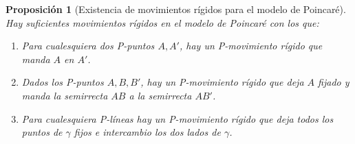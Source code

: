 \documentclass[a4paper]{amsart}
\theoremstyle{plain}
\newtheorem{proposition}{Proposición}
\begin{document}
\begin{proposition}[Existencia de movimientos rígidos para el modelo de Poincaré]
Hay suficientes movimientos rígidos en el modelo de Poincaré con los que:\\
\begin{enumerate}
\item [(1)] Para cualesquiera dos P-\textit{puntos} $A,A'$, hay un P-\textit{movimiento rígido} que manda $A$ en $A'$.
\item [(2)] Dados los P-\textit{puntos} $A,B,B'$, hay un P-\textit{movimiento rígido} que deja $A$ fijado y manda la semirrecta $AB$ a la semirrecta $AB'$.
\item [(3)] Para cualesquiera P-\textit{líneas} hay un P-\textit{movimiento rígido} que deja todos los puntos de $\gamma$ fijos e intercambio los dos lados de $\gamma$.
\end{enumerate}
\end{proposition}
\end{document}
